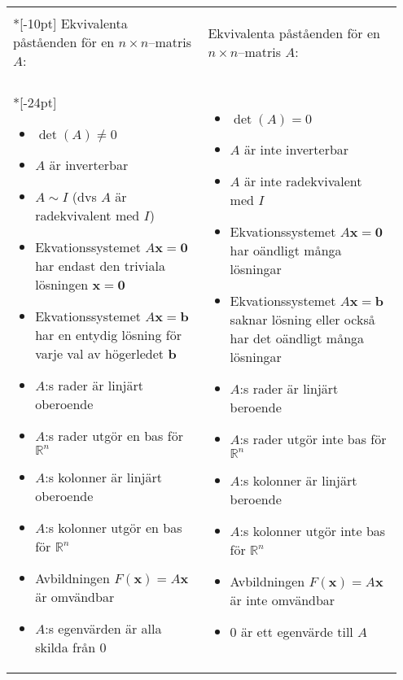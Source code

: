 \documentclass[a4paper]{article}
\def\vec#1{\mathbf #1} %
\begin{document}
\begin{tabular}{|p{0.475\linewidth}|p{0.475\linewidth}|}
  \hline
  &\\*[-10pt]
  Ekvivalenta påståenden för en $n\times n$--matris $A$:
& %
  Ekvivalenta påståenden för en $n\times n$--matris $A$:
  \\
  \hline
  \\*[-24pt]
  \begin{itemize}\addtolength{\itemsep}{-5pt}
  \item $\det(A)\ne0$
  \item $A$ är inverterbar
  \item $A\sim I$ (dvs $A$ är radekvivalent med $I$)
  \item Ekvationssystemet $A\vec x=\vec 0$ har endast den triviala
    lösningen $\vec x=\vec 0$
  \item Ekvationssystemet $A\vec x=\vec b$ har en entydig lösning för
    varje val av högerledet $\vec b$
  \item $A$:s rader är linjärt oberoende
  \item $A$:s rader utgör en bas för $\mathbb{R}^n$
  \item $A$:s kolonner är linjärt oberoende
  \item $A$:s kolonner utgör en bas för $\mathbb{R}^n$
  \item Avbildningen $F(\vec x)=A\vec x$ är omvändbar %
  \item $A$:s egenvärden är alla skilda från $0$
  \end{itemize}
  \vspace{-16pt}
  &
  \begin{itemize}\addtolength{\itemsep}{-5pt}
  \item $\det(A)=0$
  \item $A$ är inte inverterbar
  \item $A$ är inte radekvivalent med $I$
  \item Ekvationssystemet $A\vec x=\vec 0$ har oändligt många lösningar
  \item Ekvationssystemet $A\vec x=\vec b$ saknar lösning eller också
    har det oändligt många lösningar
  \item $A$:s rader är linjärt beroende
  \item $A$:s rader utgör inte bas för $\mathbb{R}^n$
  \item $A$:s kolonner är linjärt beroende
  \item $A$:s kolonner utgör inte bas för $\mathbb{R}^n$
  \item Avbildningen $F(\vec x)=A\vec x$ är inte omvändbar %
  \item $0$ är ett egenvärde till $A$
  \end{itemize}
  \vspace{-16pt}
  \\
  \hline
\end{tabular}

\label{fin@lpage}
\end{document}
